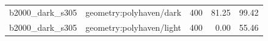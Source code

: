 \begin{longtable}{l>{\raggedright\arraybackslash}p{.42\linewidth}rrr}
b2000\_\allowbreak{}dark\_\allowbreak{}s305 & %
geometry:polyhaven/dark & %
400 & %
81.25 & %
99.42 \\ %

b2000\_\allowbreak{}dark\_\allowbreak{}s305 & %
geometry:polyhaven/light & %
400 & %
0.00 & %
55.46 \\ %


\end{longtable}
